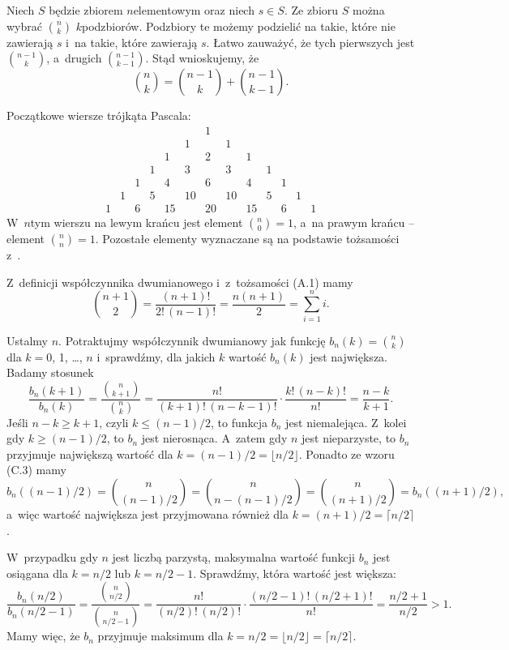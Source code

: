 \exercise %
Niech $S$ będzie zbiorem $n$\nbhyphen elementowym oraz niech $s\in S$.
Ze zbioru $S$ można wybrać $\binom{n}{k}$ $k$\nbhyphen podzbiorów.
Podzbiory te możemy podzielić na takie, które nie zawierają $s$ i~na takie, które zawierają $s$.
Łatwo zauważyć, że tych pierwszych jest $\binom{n-1}{k}$, a~drugich $\binom{n-1}{k-1}$.
Stąd wnioskujemy, że
\[
    \binom{n}{k} = \binom{n-1}{k}+\binom{n-1}{k-1}.
\]

\exercise %
Początkowe wiersze trójkąta Pascala:
\[
	\begin{array}{ccccccccccccc}
		&&&&&& 1 \\
		&&&&& 1 && 1 \\
		&&&& 1 && 2 && 1 \\
		&&& 1 && 3 && 3 && 1 \\
		&& 1 && 4 && 6 && 4 && 1 \\
		& 1 && 5 && 10 && 10 && 5 && 1 \\
		1 && 6 && 15 && 20 && 15 && 6 && 1
	\end{array}
\]
W~$n$\nbhyphen tym wierszu na lewym krańcu jest element $\binom{n}{0}=1$, a~na prawym krańcu -- element $\binom{n}{n}=1$.
Pozostałe elementy wyznaczane są na podstawie tożsamości z~.

\exercise %
Z~definicji współczynnika dwumianowego i~z~tożsamości (A.1) mamy
\[
	\binom{n+1}{2} = \frac{(n+1)!}{2!\,(n-1)!} = \frac{n(n+1)}{2} = \sum_{i=1}^ni.
\]

\exercise %
Ustalmy $n$.
Potraktujmy współczynnik dwumianowy jak funkcję $b_n(k)=\binom{n}{k}$ dla $k=0$, 1, \dots, $n$ i~sprawdźmy, dla jakich $k$ wartość $b_n(k)$ jest największa.
Badamy stosunek
\[
	\frac{b_n(k+1)}{b_n(k)} = \frac{\binom{n}{k+1}}{\binom{n}{k}} = \frac{n!}{(k+1)!\,(n-k-1)!}\cdot\frac{k!\,(n-k)!}{n!} = \frac{n-k}{k+1}.
\]
Jeśli $n-k\ge k+1$, czyli $k\le(n-1)/2$, to funkcja $b_n$ jest niemalejąca.
Z~kolei gdy $k\ge(n-1)/2$, to $b_n$ jest nierosnąca.
A~zatem gdy $n$ jest nieparzyste, to $b_n$ przyjmuje największą wartość dla $k=(n-1)/2=\lfloor n/2\rfloor$.
Ponadto ze wzoru (C.3) mamy
\[
    b_n((n-1)/2) = \binom{n}{(n-1)/2} = \binom{n}{n-(n-1)/2} = \binom{n}{(n+1)/2} = b_n((n+1)/2),
\]
a~więc wartość największa jest przyjmowana również dla $k=(n+1)/2=\lceil n/2\rceil$.

W~przypadku gdy $n$ jest liczbą parzystą, maksymalna wartość funkcji $b_n$ jest osiągana dla $k=n/2$ lub $k=n/2-1$.
Sprawdźmy, która wartość jest większa:
\[
    \frac{b_n(n/2)}{b_n(n/2-1)} = \frac{\binom{n}{n/2}}{\binom{n}{n/2-1}} = \frac{n!}{(n/2)!\,(n/2)!}\cdot\frac{(n/2-1)!\,(n/2+1)!}{n!} = \frac{n/2+1}{n/2} > 1.
\]
Mamy więc, że $b_n$ przyjmuje maksimum dla $k=n/2=\lfloor n/2\rfloor=\lceil n/2\rceil$.

